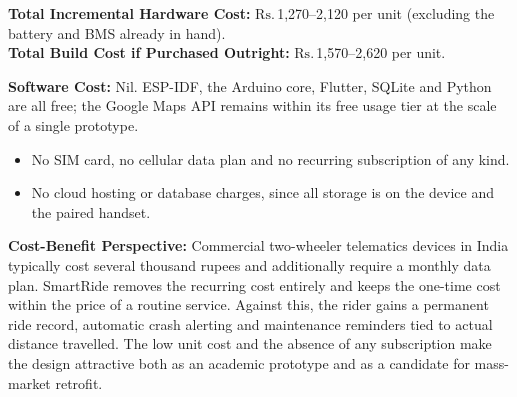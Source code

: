 \documentclass[12pt,a4paper,oneside]{report}
\newcommand{\rupee}{\textrm{Rs.}\,}
\begin{document}
\noindent\textbf{Total Incremental Hardware Cost:} \(\rupee\)1{,}270--2{,}120 per unit
(excluding the battery and BMS already in hand).\\
\noindent\textbf{Total Build Cost if Purchased Outright:} \(\rupee\)1{,}570--2{,}620 per
unit.

\vspace{1.0em}
\noindent\textbf{Software Cost:} Nil. ESP-IDF, the Arduino core, Flutter, SQLite and Python
are all free; the Google Maps API remains within its free usage tier at the scale of a
single prototype.
\begin{itemize}[leftmargin=*,itemsep=0.3em,topsep=0.5em]
\item No SIM card, no cellular data plan and no recurring subscription of any kind.
\item No cloud hosting or database charges, since all storage is on the device and the
paired handset.
\end{itemize}

\vspace{0.8em}
\noindent\textbf{Cost-Benefit Perspective:} Commercial two-wheeler telematics devices in
India typically cost several thousand rupees and additionally require a monthly data plan.
SmartRide removes the recurring cost entirely and keeps the one-time cost within the price
of a routine service. Against this, the rider gains a permanent ride record, automatic
crash alerting and maintenance reminders tied to actual distance travelled. The low unit
cost and the absence of any subscription make the design attractive both as an academic
prototype and as a candidate for mass-market retrofit.
\clearpage

\pagestyle{plain}
\setcounter{page}{1}

\tableofcontents
\clearpage

\listoftables
\clearpage

\listoffigures
\clearpage
\end{document}
